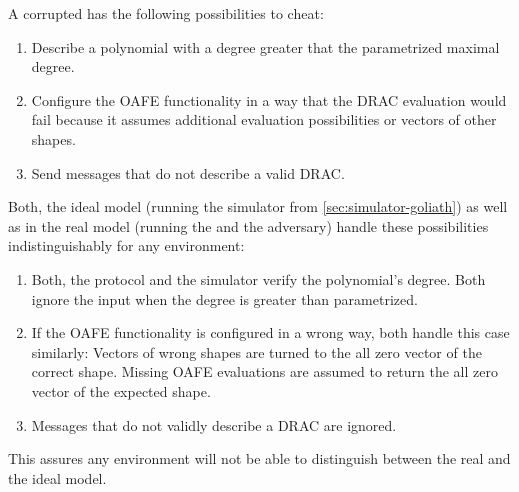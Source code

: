 
A corrupted \JWpOne{} has the following possibilities to cheat:

\begin{enumerate}

  \item Describe a polynomial with a degree greater that the parametrized
    maximal degree.

  \item Configure the OAFE functionality in a way that the DRAC evaluation would
    fail because it assumes additional evaluation possibilities or vectors of
    other shapes.

  \item Send messages that do not describe a valid DRAC\@.

\end{enumerate}

Both, the ideal model (running the simulator from \ref{sec:simulator-goliath})
as well as in the real model (running the \JWprotoSymOPE{} and the adversary)
handle these possibilities indistinguishably for any environment:

\begin{enumerate}

  \item Both, the protocol and the simulator verify the polynomial's degree.
    Both ignore the input when the degree is greater than parametrized.

  \item If the OAFE functionality is configured in a wrong way, both handle this
    case similarly: Vectors of wrong shapes are turned to the all zero vector of
    the correct shape. Missing OAFE evaluations are assumed to return the all
    zero vector of the expected shape.

  \item Messages that do not validly describe a DRAC are ignored.

\end{enumerate}

This assures any environment will not be able to distinguish between the real
and the ideal model.

